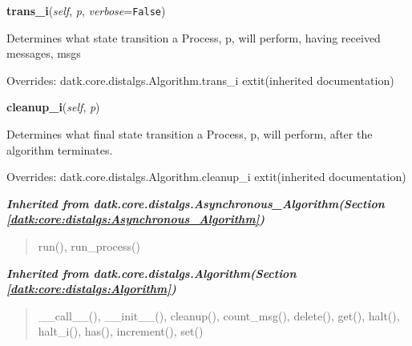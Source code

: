     \vspace{0.5ex}

\hspace{.8\funcindent}\begin{boxedminipage}{\funcwidth}

    \raggedright \textbf{trans\_i}(\textit{self}, \textit{p}, \textit{verbose}={\tt False})

\setlength{\parskip}{2ex}
    Determines what state transition a Process, p, will perform, having 
    received messages, msgs

\setlength{\parskip}{1ex}
      Overrides: datk.core.distalgs.Algorithm.trans\_i 	extit{(inherited documentation)}

    \end{boxedminipage}

    \vspace{0.5ex}

\hspace{.8\funcindent}\begin{boxedminipage}{\funcwidth}

    \raggedright \textbf{cleanup\_i}(\textit{self}, \textit{p})

\setlength{\parskip}{2ex}
    Determines what final state transition a Process, p, will perform, 
    after the algorithm terminates.

\setlength{\parskip}{1ex}
      Overrides: datk.core.distalgs.Algorithm.cleanup\_i 	extit{(inherited documentation)}

    \end{boxedminipage}


\large{\textbf{\textit{Inherited from datk.core.distalgs.Asynchronous\_Algorithm\textit{(Section \ref{datk:core:distalgs:Asynchronous_Algorithm})}}}}

\begin{quote}
run(), run\_process()
\end{quote}

\large{\textbf{\textit{Inherited from datk.core.distalgs.Algorithm\textit{(Section \ref{datk:core:distalgs:Algorithm})}}}}

\begin{quote}
\_\_call\_\_(), \_\_init\_\_(), cleanup(), count\_msg(), delete(), get(), halt(), halt\_i(), has(), increment(), set()
\end{quote}


